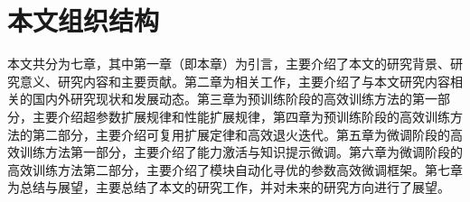 \section{本文组织结构}
本文共分为七章，其中第一章（即本章）为引言，主要介绍了本文的研究背景、研究意义、研究内容和主要贡献。第二章为相关工作，主要介绍了与本文研究内容相关的国内外研究现状和发展动态。第三章为预训练阶段的高效训练方法的第一部分，主要介绍超参数扩展规律和性能扩展规律，第四章为预训练阶段的高效训练方法的第二部分，主要介绍可复用扩展定律和高效退火迭代。第五章为微调阶段的高效训练方法第一部分，主要介绍了能力激活与知识提示微调。第六章为微调阶段的高效训练方法第二部分，主要介绍了模块自动化寻优的参数高效微调框架。第七章为总结与展望，主要总结了本文的研究工作，并对未来的研究方向进行了展望。

